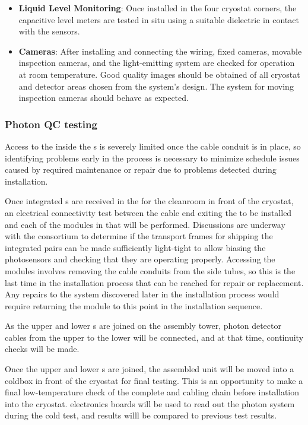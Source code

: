 \begin{itemize}
\item {\bf Liquid Level Monitoring}: Once installed in the four cryostat corners, the capacitive level meters are tested in situ 
using a suitable dielectric in contact with the sensors.

\item {\bf Cameras}: After installing and connecting the wiring, fixed cameras, movable inspection cameras, and the light-emitting system are checked for operation at room temperature. Good quality images should be obtained of all cryostat and detector areas chosen from the system's design. The system for moving inspection cameras should behave as expected.  
\end{itemize}

\subsubsection{Photon QC testing}

Access to the  inside the s is severely limited once the  cable conduit is in place, so identifying problems early in the process is necessary to minimize schedule issues caused by required  maintenance or repair due to problems detected during installation.

Once integrated s are received in the  for the cleanroom in front of the cryostat, an electrical connectivity test between the cable end exiting the  to be installed and each of the  modules in that  will be performed.  Discussions are underway with the  consortium to determine if the transport frames for shipping the integrated  pairs can be made sufficiently light-tight to allow biasing the photosensors and checking that they are operating properly.  Accessing the  modules involves removing the  cable conduits from the  side tubes, so this is the last time in the installation process that  can be reached for repair or replacement.  Any repairs to the  system discovered later in the installation process would require returning the  module to this point in the installation sequence.

As the upper and lower s are joined on the assembly tower, photon detector cables from the upper to the lower  will be connected, and at that time, continuity checks will be made.

Once the upper and lower s are joined, the assembled unit will be moved into a coldbox in front of the cryostat for final testing.  This is an opportunity to make a final low-temperature check of the complete   and cabling chain before installation into the cryostat.    electronics boards will be used to read out the photon system during the cold test, and results willl be compared to previous  test results.

